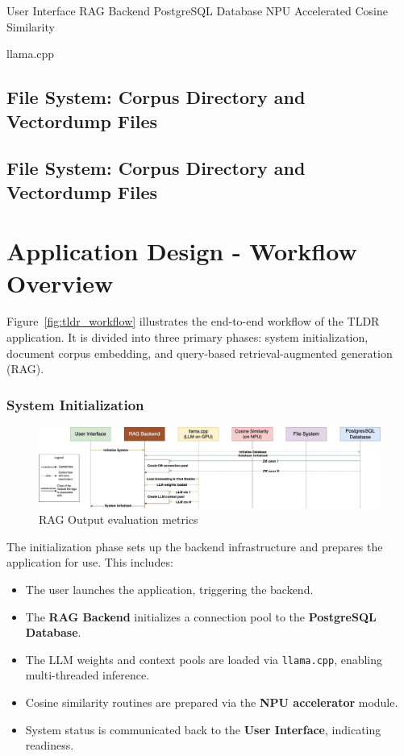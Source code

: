 User Interface RAG Backend  PostgreSQL Database NPU Accelerated Cosine Similarity  {llama.cpp
\subsection{File System: Corpus Directory and Vectordump Files}
\label{subsec:FSandVectordump_files}


\subsection{File System: Corpus Directory and Vectordump Files}
\label{subsec:FSandVectordump_files}



\section{Application Design - Workflow Overview}
\label{subsec:TldrWorkflowOverview}

Figure~\ref{fig:tldr_workflow} illustrates the end-to-end workflow of the TLDR application. It is divided into three primary phases: system initialization, document corpus embedding, and query-based retrieval-augmented generation (RAG).

\subsubsection{System Initialization}

\begin{figure}[H]
    \centering
    \includegraphics[width=1.0\linewidth]{images/tldr-app-worklfow-pt1.jpg}
    \caption{RAG Output evaluation metrics ~\cite{cardenas2023rag}}
    \label{fig:autoregressive_decoding}
\end{figure}


The initialization phase sets up the backend infrastructure and prepares the application for use. This includes:

\begin{itemize}
    \item The user launches the application, triggering the backend.
    \item The \textbf{RAG Backend} initializes a connection pool to the \textbf{PostgreSQL Database}.
    \item The LLM weights and context pools are loaded via \texttt{llama.cpp}, enabling multi-threaded inference.
    \item Cosine similarity routines are prepared via the \textbf{NPU accelerator} module.
    \item System status is communicated back to the \textbf{User Interface}, indicating readiness.
\end{itemize}

}
